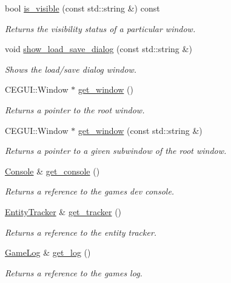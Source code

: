 \begin{DoxyCompactItemize}
bool \hyperlink{class_g_u_i_ae990bd08d2db58fcba2a15e261e618f1}{is\+\_\+visible} (const std\+::string \&) const 
\begin{DoxyCompactList}\small\item\em Returns the visibility status of a particular window. \end{DoxyCompactList}\item 
void \hyperlink{class_g_u_i_a6bf316dac4af6edbc03e9e6f6a1842a7}{show\+\_\+load\+\_\+save\+\_\+dialog} (const std\+::string \&)
\begin{DoxyCompactList}\small\item\em Shows the load/save dialog window. \end{DoxyCompactList}\item 
C\+E\+G\+U\+I\+::\+Window $\ast$ \hyperlink{class_g_u_i_a825a335740e695b10d60e0c96ffeb0b5}{get\+\_\+window} ()
\begin{DoxyCompactList}\small\item\em Returns a pointer to the root window. \end{DoxyCompactList}\item 
C\+E\+G\+U\+I\+::\+Window $\ast$ \hyperlink{class_g_u_i_a392281fef48b437e8d3b4a5fbab09191}{get\+\_\+window} (const std\+::string \&)
\begin{DoxyCompactList}\small\item\em Returns a pointer to a given subwindow of the root window. \end{DoxyCompactList}\item 
\hyperlink{class_console}{Console} \& \hyperlink{class_g_u_i_ae407027b2e7e81f8132ee7dd5252c456}{get\+\_\+console} ()
\begin{DoxyCompactList}\small\item\em Returns a reference to the game\textquotesingle{}s dev console. \end{DoxyCompactList}\item 
\hyperlink{class_entity_tracker}{Entity\+Tracker} \& \hyperlink{class_g_u_i_ab197361fb542ae6f1761be27346ec6bd}{get\+\_\+tracker} ()
\begin{DoxyCompactList}\small\item\em Returns a reference to the entity tracker. \end{DoxyCompactList}\item 
\hyperlink{class_game_log}{Game\+Log} \& \hyperlink{class_g_u_i_ac5d029ac1d5be5f405d0bb9b4beaadeb}{get\+\_\+log} ()
\begin{DoxyCompactList}\small\item\em Returns a reference to the game\textquotesingle{}s log. \end{DoxyCompactList}\item 

\end{DoxyCompactItemize}
